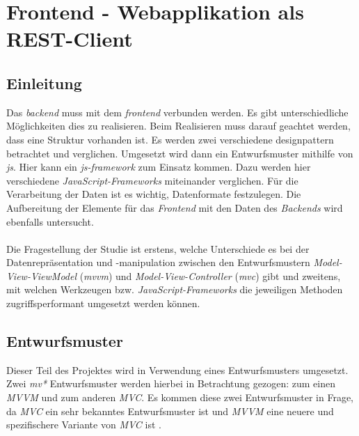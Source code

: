 
\section{Frontend - Webapplikation als REST-Client}
\label{chapter:study-datenschnittstelle}
\subsection{Einleitung}
Das \textit{\Gls{backend}} muss mit dem \textit{\Gls{frontend}} verbunden werden. Es gibt unterschiedliche Möglichkeiten dies zu realisieren. Beim Realisieren muss darauf geachtet werden, dass eine Struktur vorhanden ist. Es werden zwei verschiedene \Gls{designpattern} betrachtet und verglichen. Umgesetzt wird dann ein Entwurfsmuster mithilfe von \textit{\Gls{js}}. Hier kann ein \textit{\Gls{js}-\Gls{framework}} zum Einsatz kommen. Dazu werden hier verschiedene \textit{JavaScript-Frameworks} miteinander verglichen. Für die Verarbeitung der Daten ist es wichtig, Datenformate festzulegen. Die Aufbereitung der Elemente für das \textit{Frontend} mit den Daten des \textit{Backends} wird ebenfalls untersucht.
\\\\
Die Fragestellung der Studie ist erstens, welche Unterschiede es bei der Datenrepräsentation und -manipulation zwischen den Entwurfsmustern \textit{Model-View-ViewModel} (\textit{\Gls{mvvm}}) und \textit{Model-View-Controller} (\textit{\Gls{mvc}}) gibt und zweitens, mit welchen Werkzeugen bzw. \textit{JavaScript-Frameworks} die jeweiligen Methoden zugriffsperformant umgesetzt werden können.
\subsection{Entwurfsmuster}
Dieser Teil des Projektes wird in Verwendung eines Entwurfsmusters umgesetzt. Zwei \textit{\Gls{mv*}} Entwurfsmuster werden hierbei in Betrachtung gezogen: zum einen \textit{MVVM} und zum anderen \textit{MVC}. Es kommen diese zwei Entwurfsmuster in Frage, da \textit{MVC} ein sehr bekanntes Entwurfsmuster ist und \textit{MVVM} eine neuere und spezifischere Variante von \textit{MVC} ist \cite{mvvm_vue}.
